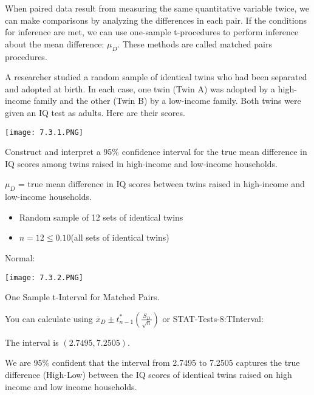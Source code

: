 \documentclass[../stats.tex]{subfiles}
\begin{document}
When paired data result from measuring the same quantitative variable twice, we can make comparisons by analyzing the differences in each pair. If the conditions for inference are met, we can use one-sample t-procedures to perform inference about the mean difference: $\mu_D$.
These methods are called matched pairs procedures.

\begin{example}
    A researcher studied a random sample of identical twins who had been separated and adopted at birth. In each case, one twin (Twin A) was adopted by a high-income family and the other (Twin B) by a low-income family. Both twins were given an IQ test as adults. Here are their scores.
    \begin{center}
        \texttt{[image: 7.3.1.PNG]}
    \end{center}

    Construct and interpret a 95\% confidence interval for the true mean difference in IQ scores among twins raised in high-income and low-income households.

    $\mu_D$ = true mean difference in IQ scores between twins raised in high-income and low-income households.

    \begin{itemize}
        \item Random sample of 12 sets of identical twins 
        \item $n=12\leq 0.10$(all sets of identical twins)
    \end{itemize}
    Normal:
    \begin{center}
        \texttt{[image: 7.3.2.PNG]}
    \end{center}

    One Sample t-Interval for Matched Pairs.

    You can calculate using $\overline{x}_D\pm t^*_{n-1}\left(\frac{S_D}{\sqrt{n}}\right)$ or STAT-Tests-8:TInterval:

    The interval is $(2.7495, 7.2505)$.

    We are 95\% confident that the interval from 2.7495 to 7.2505 captures the true difference (High-Low) between the IQ scores of identical twins raised on high income and low income households.
\end{example}
\end{document}
